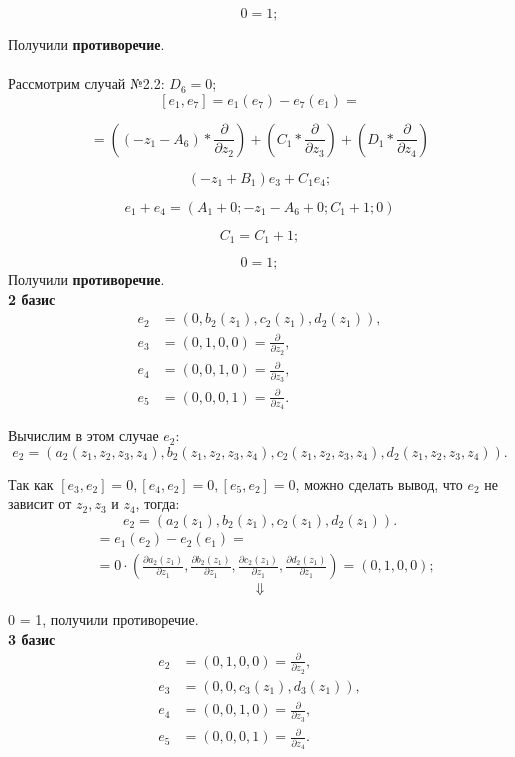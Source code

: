 \documentclass[12pt]{article}
\begin{document}
\[
0 = 1;
\]

Получили \textbf{противоречие}.\\\\
Рассмотрим случай №2.2: $D_6 = 0$; \\

\[
[e_1, e_7] = e_1(e_7) - e_7(e_1) = 
\]

\[
= \left( (-z_1 - A_6) * \frac{\partial}{\partial z_2} \right)
+ \left( C_1 * \frac{\partial}{\partial z_3} \right)
+ \left( D_1 * \frac{\partial}{\partial z_4} \right)
\]

\[
(-z_1 + B_1)e_3 + C_1e_4;
\]

\[
e_1 + e_4 = \left(A_1 + 0; -z_1 - A_6 + 0; C_1 + 1; 0 \right)
\]

\[
C_1 = C_1 + 1;
\]

\[
0 = 1;
\]
Получили \textbf{противоречие}. \\

\textbf{2 базис} 
\begin{align*}
e_2 &= (0,b_2(z_1),c_2(z_1),d_2(z_1)), \\
e_3 &= (0,1,0,0) = \frac{\partial}{\partial z_2}, \\
e_4 &= (0,0,1,0) = \frac{\partial}{\partial z_3}, \\
e_5 &= (0,0,0,1) = \frac{\partial}{\partial z_4}. 
\end{align*}

Вычислим в этом случае $e_2$:
$$e_2 = (a_2(z_1,z_2,z_3,z_4), b_2(z_1,z_2,z_3,z_4), c_2(z_1,z_2,z_3,z_4), d_2(z_1,z_2,z_3,z_4)).$$

Так как $[e_3,e_2] = 0, [e_4,e_2] = 0, [e_5,e_2] = 0$, можно сделать вывод, что $e_2$ не зависит от $z_2, z_3 \text{ и } z_4$, тогда: 
$$e_2 = (a_2(z_1), b_2(z_1), c_2(z_1), d_2(z_1)).$$ 
\begin{align*}
[e_1,e_2] &= e_1(e_2) - e_2(e_1) = \\
&= 0 \cdot \left(
\frac{\partial a_2(z_1)}{\partial z_1}, 
\frac{\partial b_2(z_1)}{\partial z_1}, 
\frac{\partial c_2(z_1)}{\partial z_1},
\frac{\partial d_2(z_1)}{\partial z_1}
\right) = (0,1,0,0);
\end{align*}
$$\Downarrow$$

0 = 1, получили противоречие. \\

\textbf{3 базис} 
\begin{align*}
e_2 &= (0,1,0,0) = \frac{\partial}{\partial z_2}, \\
e_3 &= (0,0,c_3(z_1),d_3(z_1)), \\
e_4 &= (0,0,1,0) = \frac{\partial}{\partial z_3}, \\
e_5 &= (0,0,0,1) = \frac{\partial}{\partial z_4}. 
\end{align*}
\end{document}
